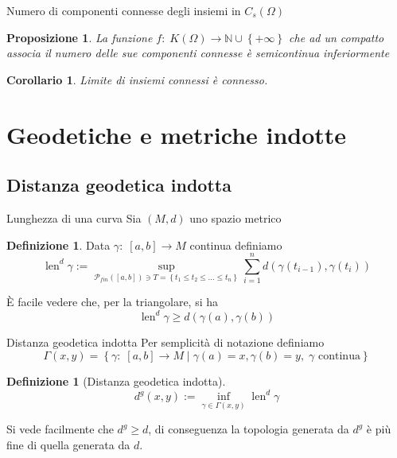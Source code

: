 \documentclass{beamer}
\newcounter{counter1}
\theoremstyle{plain}
\newtheorem{mypro}[counter1]{Proposizione}
\newtheorem{mycor}[counter1]{Corollario}
\theoremstyle{definition}
\newtheorem{mydef}[counter1]{Definizione}
\theoremstyle{remark}
\newcommand{\set}[1]{\left\{#1\right\}}
\newcommand{\pa}[1]{\left(#1\right)}
\newcommand{\bra}[1]{\left[#1\right]}
\DeclareMathOperator{\len}{len}
\begin{document}
\begin{frame}{Numero di componenti connesse degli insiemi in
    $C_s(\Omega)$}
  \begin{mypro}
    La funzione $f:\; K(\Omega) \rightarrow \mathbb{N} \cup \set{+\infty}$
    che ad un compatto associa il numero delle sue componenti connesse è
    semicontinua inferiormente
  \end{mypro}
  \begin{mycor}
    Limite di insiemi connessi è connesso.
  \end{mycor}
\end{frame}

\section{Geodetiche e metriche indotte}

\subsection{Distanza geodetica indotta}

\begin{frame}{Lunghezza di una curva}
  Sia $(M,d)$ uno spazio metrico
  \begin{mydef}
    Data $\gamma : \; \bra{a,b} \to M$ continua definiamo
    \[ \len^d \gamma := \sup _{\mathcal{P}_{fin}(\bra{a,b}) \ni T =
      \set{t_1 \le t_2 \le ... \le t_n}} \sum_{i=1}^n d\pa{
      \gamma\pa{t_{i-1}}, \gamma\pa{t_i}} \]
  \end{mydef}
  È facile vedere che, per la triangolare, si ha
  \[ \len^d \gamma \ge d\pa{\gamma\pa{a}, \gamma\pa{b}} \]

\end{frame}

\begin{frame}{Distanza geodetica indotta}
  Per semplicità di notazione definiamo
  \[ \Gamma (x,y) = \set{\gamma:\; \bra{a,b} \to M \mid
    \gamma(a) = x, \gamma(b) = y,\; \gamma \text{ continua}} \]
  
  \begin{mydef}[Distanza geodetica indotta]
    \[ d^g (x,y) := \inf _{\gamma \in \Gamma(x,y)} \len^d \gamma \]
  \end{mydef}

  Si vede facilmente che $d^g \ge d$, di conseguenza la topologia
  generata da $d^g$ è più fine di quella generata da $d$.
\end{frame}
\end{document}
